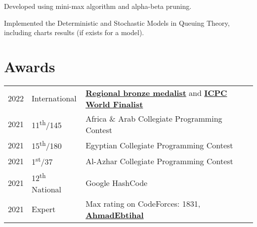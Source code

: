 \documentclass[]{deedy-resume-openfont}
\begin{document}
\begin{minipage}[t]{0.66\textwidth}
\href{https://github.com/ahr9n/unbeatable-tic-tac-toe}{}
\begin{tightemize}
    \item Developed using mini-max algorithm and alpha-beta pruning.\\ 
\end{tightemize}
\sectionsep

\href{https://github.com/ahr9n/in-the-queue-please}{}
\begin{tightemize}
    \item Implemented the Deterministic and Stochastic Models in Queuing Theory, including charts results (if exists for a model).\\
\end{tightemize}
\sectionsep



\section{Awards} 
\begin{tabular}{rll}
2022 & International & \href{https://www.linkedin.com/feed/update/urn:li:activity:6876965006358016000/}{\textbf{Regional bronze medalist}} and \href{https://icpc.global/ICPCID/D88WKIAMLAUS}{\textbf{ICPC World Finalist}}\\
2021 & 11\textsuperscript{th}/145 & Africa \& Arab Collegiate Programming Contest\\
2021 & 15\textsuperscript{th}/180 & Egyptian Collegiate Programming Contest\\
2021 & 1\textsuperscript{st}/37 & Al-Azhar Collegiate Programming Contest\\
2021 & 12\textsuperscript{th} National & Google HashCode \\
2021 & Expert & Max rating on CodeForces: 1831,  \href{https://codeforces.com/profile/AhmadEbtihal}{\textbf{AhmadEbtihal}}
\end{tabular}
\sectionsep


% 
% 

\end{minipage} 
\end{document}
